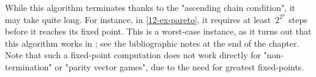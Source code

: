 While this algorithm terminates thanks to the "ascending chain
condition", it may take quite long.  For instance, in
\cref{12-ex-pareto}, it requires at least~$2^{2^n}$ steps before it
reaches its fixed point.  This is a worst-case instance, as it turns
out that this algorithm works in \kEXP[2]; see the bibliographic notes
at the end of the chapter.  Note that such a
fixed-point computation does not work directly for "non-termination"
or "parity vector games", due to the need for greatest fixed-points.

